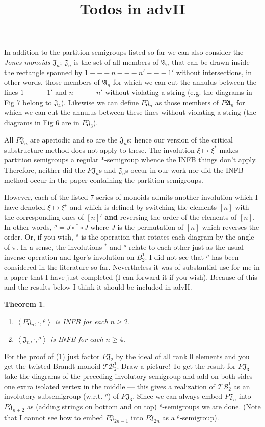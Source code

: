 \documentclass[11pt,reqno]{amsart}
\title[Todos]{Todos in advII}
\numberwithin{equation}{section}
\newtheorem{Thm}{Theorem}[section]
\theoremstyle{remark}
\def\A{\mathfrak{A}}
\def\J{\mathfrak{J}}
\begin{document}
\maketitle
In addition to the partition semigroups listed so far we can also consider the \emph{Jones monoids} $\J_n$; $\J_n$ is the set of all members of $\A_n$ that can be drawn inside the rectangle spanned by $1---n---n'---1'$ without intersections, in other words, those members of $\A_n$ for which we can cut the annulus between the lines $1---1'$ and $n---n'$ without violating a string (e.g. the diagrams in Fig 7 belong to $\J_4$). Likewise we can define $P\J_n$ as those members of $P\A_n$ for which we can cut the annulus between these lines without violating a string (the diagrams in Fig 6 are in $P\J_3$).

All $P\J_n$ are aperiodic and so are the $\J_n$s; hence our version of the critical substructure method does not apply to these. The involution $\xi\mapsto \xi^*$ makes partition semigroups a regular $*$-semigroup whence the INFB things don't apply. Therefore, neither did the $P\J_n$s and $\J_n$s  occur in our work nor did the INFB method occur in the paper containing the partition semigroups.

However, each of the listed 7 series of monoids admits another involution which I have denoted $\xi\mapsto \xi^\rho$ and which is defined by switching the elements $[n]$ with the corresponding ones of $[n]'$ \textbf{and} reversing the order of the elements of $[n]$. In other words, ${}^\rho=J\circ{}^*\circ J$ where $J$ is the permutation of $[n]$ which reverses the order. Or, if you wish, ${}^\rho$ is the operation that rotates  each diagram by the angle of $\pi$. In a sense, the involutions ${}^*$ and ${}^\rho$ relate to each other just as the usual inverse operation and Igor's involution on $B_2^1$. I did not see that ${}^\rho$ has been considered in the literature so far. Nevertheless it was of substantial use for me in a paper that I have just completed (I can forward it if you wish). Because of this and the results below I think it should be included in advII.

\begin{Thm}\begin{enumerate}
\item  $\left<P\J_n,\cdot,{}^\rho\right>$ is INFB for each $n\ge 2$.
\item $\left<\J_n,\cdot,{}^\rho\right>$ is INFB for each $n\ge 4$.
\end{enumerate}
\end{Thm}
For the proof of (1) just factor $P\J_2$ by the ideal of all rank $0$ elements and you get the twisted Brandt monoid $\mathcal{TB}_2^1$. Draw a picture! To get the result for $P\J_3$ take the diagrams of the preceding involutory semigroup and add on both sides one extra isolated vertex in the middle --- this gives a realization of $\mathcal{TB}_2^1$ as an involutory subsemigroup (w.r.t. ${}^\rho$) of $P\J_3$. Since we can always embed $P\J_n$ into $P\J_{n+2}$ as (adding strings on bottom and on top)  ${}^\rho$-semigroups we are done. (Note that I cannot see how to embed $P\J_{2n-1}$ into $P\J_{2n}$ as a ${}^\rho$-semigroup).
\end{document}
